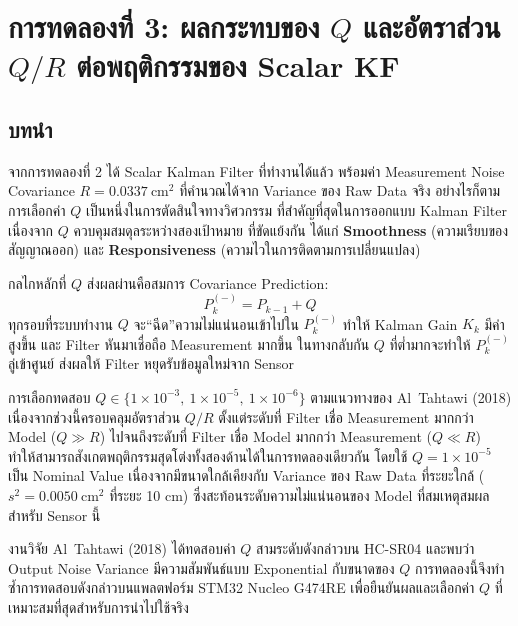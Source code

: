 
\section{การทดลองที่ 3: ผลกระทบของ $Q$ และอัตราส่วน $Q/R$
         ต่อพฤติกรรมของ Scalar KF}

\subsection{บทนำ}

จากการทดลองที่ 2 ได้ Scalar Kalman Filter ที่ทำงานได้แล้ว พร้อมค่า
Measurement Noise Covariance $R = 0.0337\ \text{cm}^2$ ที่คำนวณได้จาก Variance
ของ Raw Data จริง อย่างไรก็ตาม การเลือกค่า $Q$ เป็นหนึ่งในการตัดสินใจทางวิศวกรรม
ที่สำคัญที่สุดในการออกแบบ Kalman Filter เนื่องจาก $Q$ ควบคุมสมดุลระหว่างสองเป้าหมาย
ที่ขัดแย้งกัน ได้แก่ \textbf{Smoothness} (ความเรียบของสัญญาณออก)
และ \textbf{Responsiveness} (ความไวในการติดตามการเปลี่ยนแปลง)

กลไกหลักที่ $Q$ ส่งผลผ่านคือสมการ Covariance Prediction:
\begin{equation}
    P_k^{(-)} = P_{k-1} + Q
    \label{eq:cov_predict_exp3}
\end{equation}
ทุกรอบที่ระบบทำงาน $Q$ จะ``ฉีด''ความไม่แน่นอนเข้าไปใน $P_k^{(-)}$
ทำให้ Kalman Gain $K_k$ มีค่าสูงขึ้น และ Filter หันมาเชื่อถือ Measurement มากขึ้น
ในทางกลับกัน $Q$ ที่ต่ำมากจะทำให้ $P_k^{(-)}$ ลู่เข้าศูนย์
ส่งผลให้ Filter หยุดรับข้อมูลใหม่จาก Sensor

การเลือกทดสอบ $Q \in \{1\times10^{-3},\ 1\times10^{-5},\ 1\times10^{-6}\}$
ตามแนวทางของ Al~Tahtawi (2018) เนื่องจากช่วงนี้ครอบคลุมอัตราส่วน $Q/R$
ตั้งแต่ระดับที่ Filter เชื่อ Measurement มากกว่า Model ($Q \gg R$)
ไปจนถึงระดับที่ Filter เชื่อ Model มากกว่า Measurement ($Q \ll R$)
ทำให้สามารถสังเกตพฤติกรรมสุดโต่งทั้งสองด้านได้ในการทดลองเดียวกัน
โดยใช้ $Q = 1\times10^{-5}$ เป็น Nominal Value เนื่องจากมีขนาดใกล้เคียงกับ
Variance ของ Raw Data ที่ระยะใกล้ ($s^2 = 0.0050\ \text{cm}^2$ ที่ระยะ 10 cm)
ซึ่งสะท้อนระดับความไม่แน่นอนของ Model ที่สมเหตุสมผลสำหรับ Sensor นี้

งานวิจัย Al~Tahtawi (2018) ได้ทดสอบค่า $Q$ สามระดับดังกล่าวบน HC-SR04
และพบว่า Output Noise Variance มีความสัมพันธ์แบบ Exponential กับขนาดของ $Q$
การทดลองนี้จึงทำซ้ำการทดสอบดังกล่าวบนแพลตฟอร์ม STM32 Nucleo G474RE
เพื่อยืนยันผลและเลือกค่า $Q$ ที่เหมาะสมที่สุดสำหรับการนำไปใช้จริง

